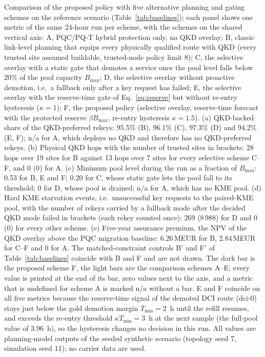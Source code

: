 Comparison of the proposed policy with five alternative planning and gating
schemes on the reference scenario (Table~\ref{tab:baselines}); each panel shows
one metric of the same 24-hour run per scheme, with the schemes on the shared
vertical axis: A, PQC/PQ-T hybrid protection only, no QKD overlay; B, classic
link-level planning that equips every physically qualified route with QKD
(every trusted site assumed buildable, trusted-node policy limit 8); C, the
selective overlay with a static gate that demotes a service once the pool level
falls below 20\% of the pool capacity $B_{\max}$; D, the selective overlay
without proactive demotion, i.e.\ a fallback only after a key request has
failed; E, the selective overlay with the reserve-time gate of
Eq.~\eqref{eq:reserve} but without re-entry hysteresis ($\kappa = 1$); F, the
proposed policy (selective overlay, reserve-time forecast with the protected
reserve $\beta B_{\max}$, re-entry hysteresis $\kappa = 1.5$).
(a) QKD-backed share of the QKD-preferred rekeys: 95.5\% (B), 96.1\% (C),
97.3\% (D) and 94.2\% (E, F); n/a for A, which deploys no QKD and therefore
has no QKD-preferred rekeys.
(b) Physical QKD hops with the number of trusted sites in brackets: 28 hops
over 19 sites for B against 13 hops over 7 sites for every selective scheme
C--F, and 0 (0) for A.
(c) Minimum pool level during the run as a fraction of $B_{\max}$: 0.53 for B,
E and F; 0.20 for C, whose static gate lets the pool fall to its threshold;
0 for D, whose pool is drained; n/a for A, which has no KME pool.
(d) Hard KME starvation events, i.e.\ unsuccessful key requests to the
paired-KME pool, with the number of rekeys carried by a fallback mode after
the decided QKD mode failed in brackets (each rekey counted once):
269 (8\,988) for D and 0 (0) for every other scheme.
(e) Five-year assurance premium, the NPV of the QKD overlay above the PQC
migration baseline: 6.26\,MEUR for B, 2.84\,MEUR for C--F and 0 for A.
The matched-constraint controls B$'$ and F$'$ of Table~\ref{tab:baselines}
coincide with B and F and are not drawn. The dark bar is the proposed scheme F, the light bars are the comparison
schemes A--E; every value is printed at the end of its bar, zero values next
to the axis, and a metric that is undefined for scheme A is marked n/a
without a bar. E and F coincide on all five metrics because the reserve-time
signal of the demoted DCI route (dci-0) stays just below the gold demotion
margin $T_{\min} = 2$~h until the refill resumes, and exceeds the re-entry
threshold $\kappa T_{\min} = 3$~h at the next sample (the full-pool value of
3.96~h), so the hysteresis changes no decision in this run. All values are
planning-model outputs of the seeded synthetic scenario (topology seed 7,
simulation seed 11); no carrier data are used.
